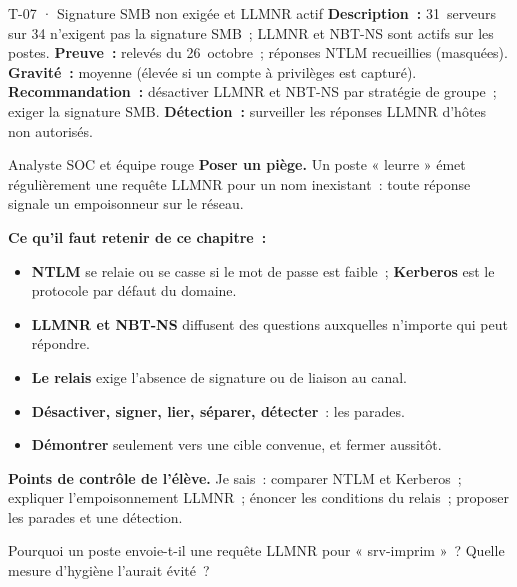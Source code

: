\begin{boxobjet}{T-07 · Signature SMB non exigée et LLMNR actif}
\textbf{Description~:} 31~serveurs sur 34 n'exigent pas la signature SMB~;
LLMNR et NBT-NS sont actifs sur les postes. \textbf{Preuve~:} relevés du
26~octobre~; réponses NTLM recueillies (masquées). \textbf{Gravité~:}
moyenne (élevée si un compte à privilèges est capturé).
\textbf{Recommandation~:} désactiver LLMNR et NBT-NS par stratégie de
groupe~; exiger la signature SMB. \textbf{Détection~:} surveiller les
réponses LLMNR d'hôtes non autorisés.
\end{boxobjet}

\begin{boxmetier}{Analyste SOC et équipe rouge}
\textbf{Poser un piège.} Un poste « leurre » émet régulièrement une requête
LLMNR pour un nom inexistant~: toute réponse signale un empoisonneur sur le
réseau.
\end{boxmetier}

\separateur

\begin{boxresume}
\textbf{Ce qu'il faut retenir de ce chapitre~:}
\begin{itemize}
    \item \textbf{NTLM} se relaie ou se casse si le mot de passe est faible~;
          \textbf{Kerberos} est le protocole par défaut du domaine.
    \item \textbf{LLMNR et NBT-NS} diffusent des questions auxquelles
          n'importe qui peut répondre.
    \item \textbf{Le relais} exige l'absence de signature ou de liaison au
          canal.
    \item \textbf{Désactiver, signer, lier, séparer, détecter}~: les parades.
    \item \textbf{Démontrer} seulement vers une cible convenue, et fermer
          aussitôt.
\end{itemize}
\end{boxresume}

\begin{boxinfo}
\textbf{Points de contrôle de l'élève.} Je sais~: comparer NTLM et
Kerberos~; expliquer l'empoisonnement LLMNR~; énoncer les conditions du
relais~; proposer les parades et une détection.
\end{boxinfo}

\bigskip

\begin{boxexo}[title={\ding{45}\quad Exercice~9.1. LLMNR \niveaubase}]
Pourquoi un poste envoie-t-il une requête LLMNR pour « srv-imprim »~?
Quelle mesure d'hygiène l'aurait évité~?
\end{boxexo}

